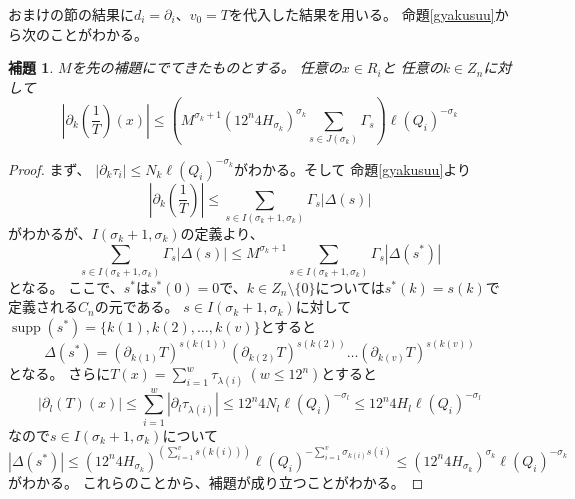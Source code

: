 \documentclass[leqno]{jsarticle}
\newtheorem{lem}[thm]{補題}
\DeclareMathOperator{\supp}{supp}
\begin{document}
おまけの節の結果に$d_i=\partial_{i}$、$v_0=T$を代入した結果を用いる。
命題\ref{gyakusuu}から次のことがわかる。
\begin{lem}$M$を先の補題にでてきたものとする。
任意の$x\in R_i$と
任意の$k\in Z_n$に対して
\[
\left|\partial_k\left(\frac{1}{T}\right)(x)\right|\le 
\left(M^{\sigma_k+1}(12^n4H_{\sigma_k})^{\sigma_k}\sum_{s\in J(\sigma_k)}\Gamma_s\right)\ell(Q_i)^{-\sigma_k}
\]
\end{lem}
\begin{proof}
まず、
$|\partial_k\tau_i|\le N_k\ell(Q_i)^{-\sigma_k}$がわかる。そして
命題\ref{gyakusuu}より
\[
\left|\partial_k\left(\frac{1}{T}\right)\right|\le 
\sum_{s\in I(\sigma_k+1,\sigma_k)}\Gamma_s|\Delta(s)|
\]
がわかるが、$I(\sigma_k+1, \sigma_k)$の定義より、
\[
\sum_{s\in I(\sigma_k+1,\sigma_k)}\Gamma_s|\Delta(s)|\le 
M^{\sigma_k+1}\sum_{s\in I(\sigma_k+1, \sigma_k)}\Gamma_s|\Delta(s^{*})|
\]
となる。
ここで、$s^{*}$は$s^{*}(0)=0$で、$k\in Z_n\setminus\{0\}$については$s^{*}(k)=s(k)$で定義される$C_n$の元である。
$s\in I(\sigma_k+1,\sigma_k)$に対して
$\supp(s^{*})=\{k(1), k(2), \dots, k(v)\}$とすると
\[
\Delta(s^*)=(\partial_{k(1)}T)^{s(k(1))}(\partial_{k(2)}T)^{s(k(2))}\dots (\partial_{k(v)}T)^{s(k(v))}
\]
となる。
さらに$T(x)=\sum_{i=1}^w\tau_{\lambda(i)}\ (w\le 12^n)$とすると
\[
|\partial_l(T)(x)|\le \sum_{i=1}^w|\partial_l\tau_{\lambda(i)}|\le 12^n4N_l\ell(Q_i)^{-\sigma_l}
\le 12^n4H_l\ell(Q_i)^{-\sigma_l}
\]
なので$s\in I(\sigma_k+1, \sigma_k)$について
\[
|\Delta(s^*)|\le (12^n4H_{\sigma_k})^{(\sum_{i=1}^vs(k(i)))}\ell(Q_i)^{-\sum_{i=1}^v\sigma_{k(i)}s(i)}
\le (12^n4H_{\sigma_k})^{\sigma_k}\ell(Q_i)^{-\sigma_k}
\]
がわかる。
これらのことから、補題が成り立つことがわかる。
\end{proof}
\end{document}
